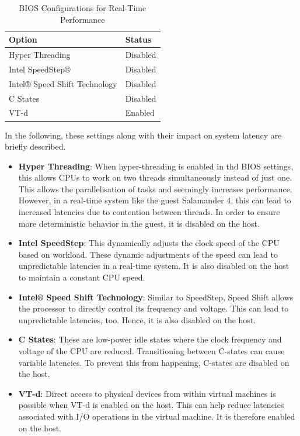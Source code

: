 \documentclass[MMR,Master,english]{twbook}
\begin{document}
\begin{table}[H]
	\centering
	\caption{BIOS Configurations for Real-Time Performance}
	\label{tab:bios_configuration}
	\setlength{\tabcolsep}{0.5em} %
	{\renewcommand{\arraystretch}{1.2}%
		\begin{tabular}{|l|l|}
			\hline
			\textbf{Option}               & \textbf{Status} \\
			\hline
			Hyper Threading               & Disabled        \\
			\hline
			Intel SpeedStep®              & Disabled        \\
			\hline
			Intel® Speed Shift Technology & Disabled        \\
			\hline
			C States                      & Disabled        \\
			\hline
			VT-d                          & Enabled         \\
			\hline
		\end{tabular}}
\end{table}

\noindent In the following, these settings along with their impact on system latency are briefly described.

\begin{itemize}
	\item \textbf{Hyper Threading}: When hyper-threading is enabled in thd BIOS settings, this allows CPUs to work on two threads simultaneously instead of just one. This allows the parallelisation of tasks and seemingly increases performance. However, in a real-time system like the guest Salamander 4, this can lead to increased latencies due to contention between threads. In order to ensure more deterministic behavior in the guest, it is disabled on the host.
	\item \textbf{Intel SpeedStep}: This dynamically adjusts the clock speed of the CPU based on workload. These dynamic adjustments of the speed can lead to unpredictable latencies in a real-time system. It is also disabled on the host to maintain a constant CPU speed.
	\item \textbf{Intel® Speed Shift Technology}: Similar to SpeedStep, Speed Shift allows the processor to directly control its frequency and voltage. This can lead to unpredictable latencies, too. Hence, it is also disabled on the host.
	\item \textbf{C States}: These are low-power idle states where the clock frequency and voltage of the CPU are reduced. Transitioning between C-states can cause variable latencies. To prevent this from happening, C-states are disabled on the host.
	\item \textbf{VT-d}: Direct access to physical devices from within virtual machines is possible when VT-d is enabled on the host. This can help reduce latencies associated with I/O operations in the virtual machine. It is therefore enabled on the host.
\end{itemize}
\end{document}

